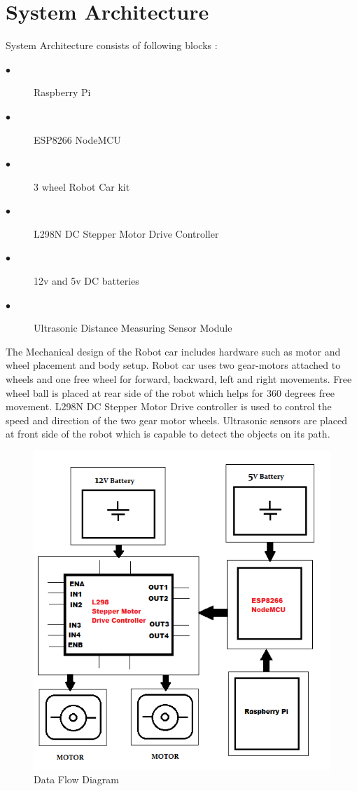 \documentclass[sigconf]{acmart}
\begin{document}
\section{System Architecture}
System Architecture consists of following blocks :
\begin{description}
    \item[$\bullet$] Raspberry Pi

    \item[$\bullet$] ESP8266 NodeMCU 

    \item[$\bullet$] 3 wheel Robot Car kit

    \item[$\bullet$] L298N DC Stepper Motor Drive Controller 

    \item[$\bullet$] 12v and 5v DC batteries
    
    \item[$\bullet$] Ultrasonic Distance Measuring Sensor Module 
    
\end{description}

The Mechanical design of the Robot car includes hardware such as motor and wheel placement and body setup. Robot car uses two gear-motors attached to wheels and one free wheel for forward, backward, left and right movements. Free wheel ball is placed at rear side of the robot which helps for 360 degrees free movement. L298N DC Stepper Motor Drive controller is used to control the speed and direction of the two gear motor wheels. Ultrasonic sensors are placed at front side of the robot which is capable to detect the objects on its path.

\begin{figure}[htb]
      \includegraphics[width=\columnwidth]{images/FlowDiagram.png}
      \caption{Data Flow Diagram}
\end{figure}
\end{document}
